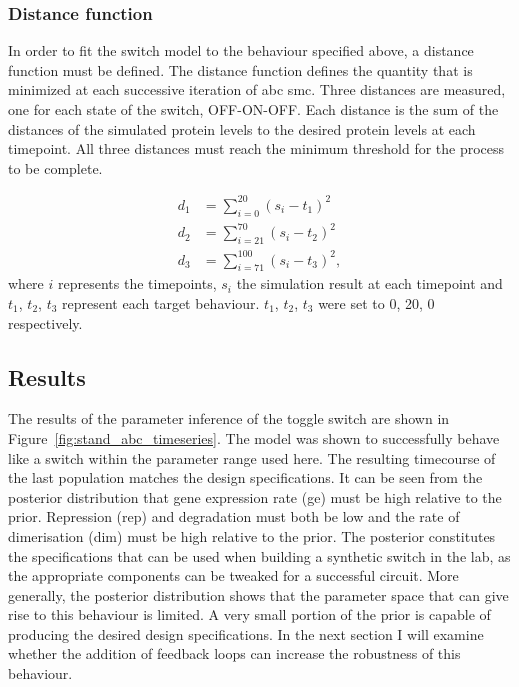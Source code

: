 \subsubsection{Distance function}
In order to fit the switch model to the behaviour specified above, a distance function must be defined. The distance function defines the quantity that is minimized at each successive iteration of \acrshort{abc} \acrshort{smc}. Three distances are measured, one for each state of the switch, OFF-ON-OFF. Each distance is the sum of the distances of the simulated protein levels to the desired protein levels at each timepoint. All three distances must reach the minimum threshold for the process to be complete. 

\begin{align}\label{eq:dist}
	d_1 &= \sum_{i=0}^{20} (s_i-t_1)^2 \\
	d_2 &= \sum_{i=21}^{70} (s_i-t_2)^2 \\
	d_3 &=  \sum_{i=71}^{100} (s_i-t_3)^2,
\end{align}
where $i$ represents the timepoints, $s_i$ the simulation result at  each timepoint and $t_1$, $t_2$, $t_3$ represent each target behaviour. $t_1$, $t_2$, $t_3$ were set to 0, 20, 0 respectively. 



\subsection{Results}

The results of the parameter inference of the toggle switch are shown in Figure~\ref{fig:stand_abc_timeseries}. The model was shown to successfully behave like a switch within the parameter range used here. The resulting timecourse of the last population matches the design specifications. It can be seen from the posterior distribution that gene expression rate (ge) must be high relative to the prior. Repression (rep) and degradation must both be low and the rate of dimerisation (dim) must be high relative to the prior. The posterior constitutes the specifications that can be used when building a synthetic switch in the lab, as the appropriate components can be tweaked for a successful circuit. More generally, the posterior distribution shows that the parameter space that can give rise to this behaviour is limited. A very small portion of the prior is capable of producing the desired design specifications. In the next section I will examine whether the addition of feedback loops can increase the robustness of this behaviour.



